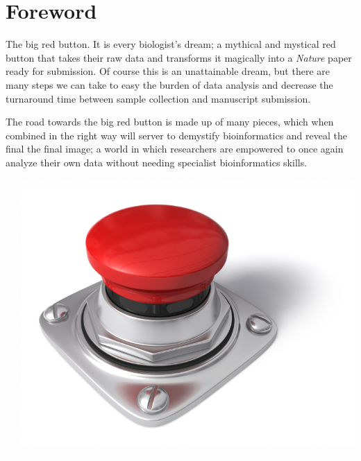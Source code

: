 \chapter*{Foreword}
{}
\setlength\parindent{0pt}
\vspace{-1cm}
The big red button. It is every biologist's dream; a mythical and mystical red button that takes their raw data and transforms it magically into a \emph{Nature} paper ready for submission. Of course this is an unattainable dream, but there are many steps we can take to easy the burden of data analysis and decrease the
turnaround time between sample collection and manuscript submission.

The road towards the big red button is made up of many pieces, which when combined in the right way will server to demystify bioinformatics and reveal the final the final image; a world in which researchers are empowered to once again analyze their own data without needing specialist bioinformatics skills.


\begin{center}
\includegraphics[scale=0.25]{chapters/images/redbutton.jpg}
\end{center}

